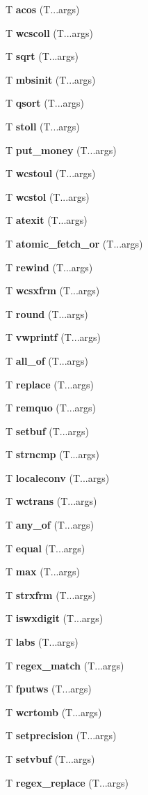 \begin{DoxyCompactItemize}
T {\bf acos} (T...\+args)
\item 
T {\bf wcscoll} (T...\+args)
\item 
T {\bf sqrt} (T...\+args)
\item 
T {\bf mbsinit} (T...\+args)
\item 
T {\bf qsort} (T...\+args)
\item 
T {\bf stoll} (T...\+args)
\item 
T {\bf put\+\_\+money} (T...\+args)
\item 
T {\bf wcstoul} (T...\+args)
\item 
T {\bf wcstol} (T...\+args)
\item 
T {\bf atexit} (T...\+args)
\item 
T {\bf atomic\+\_\+fetch\+\_\+or} (T...\+args)
\item 
T {\bf rewind} (T...\+args)
\item 
T {\bf wcsxfrm} (T...\+args)
\item 
T {\bf round} (T...\+args)
\item 
T {\bf vwprintf} (T...\+args)
\item 
T {\bf all\+\_\+of} (T...\+args)
\item 
T {\bf replace} (T...\+args)
\item 
T {\bf remquo} (T...\+args)
\item 
T {\bf setbuf} (T...\+args)
\item 
T {\bf strncmp} (T...\+args)
\item 
T {\bf localeconv} (T...\+args)
\item 
T {\bf wctrans} (T...\+args)
\item 
T {\bf any\+\_\+of} (T...\+args)
\item 
T {\bf equal} (T...\+args)
\item 
T {\bf max} (T...\+args)
\item 
T {\bf strxfrm} (T...\+args)
\item 
T {\bf iswxdigit} (T...\+args)
\item 
T {\bf labs} (T...\+args)
\item 
T {\bf regex\+\_\+match} (T...\+args)
\item 
T {\bf fputws} (T...\+args)
\item 
T {\bf wcrtomb} (T...\+args)
\item 
T {\bf setprecision} (T...\+args)
\item 
T {\bf setvbuf} (T...\+args)
\item 
T {\bf regex\+\_\+replace} (T...\+args)
\item 

\end{DoxyCompactItemize}

